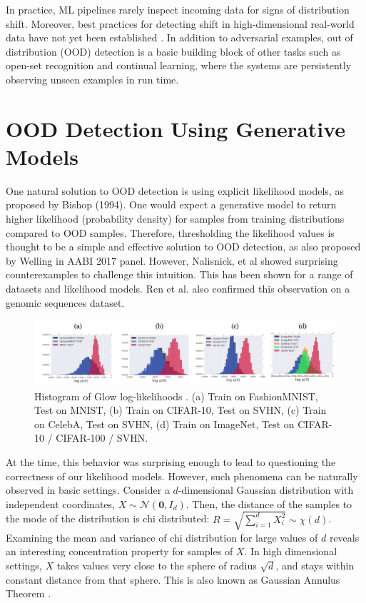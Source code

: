 In practice, ML pipelines rarely inspect incoming data for signs of distribution shift. Moreover, best practices for detecting shift in high-dimensional real-world data have not yet been established \cite{rabanser2019failing}. In addition to adversarial examples, out of distribution (OOD) detection is a basic building block of other tasks such as open-set recognition \cite{ren2019likelihood} and continual learning, where the systems are persistently observing unseen examples in run time.

\section{OOD Detection Using Generative Models}

One natural solution to OOD detection is using explicit likelihood models, as proposed by Bishop (1994). One would expect a generative model to return higher likelihood (probability density) for samples from training distributions compared to OOD samples. Therefore, thresholding the likelihood values is thought to be a simple and effective solution to OOD detection, as also proposed by Welling in AABI 2017 panel. However, Nalisnick, et al \cite{nalisnick2018deep} showed surprising counterexamples to challenge this intuition. This has been shown for a range of datasets and likelihood models. Ren et al. \cite{ren2019likelihood} also confirmed this observation on a genomic sequences dataset. 

\begin{figure}[h]
    \centering
    \vspace{-1em}
    \includegraphics[width=\textwidth]{figures/ch4/nalisnic.png}
    \caption{Histogram of Glow log-likelihoods \cite{nalisnick2018deep}. (a) Train on FashionMNIST, Test on MNIST, (b) Train on CIFAR-10, Test on SVHN, (c) Train on CelebA, Test on SVHN, (d) Train on ImageNet, Test on CIFAR-10 / CIFAR-100 / SVHN.}
    \label{fig:4-3}
\end{figure}

At the time, this behavior was surprising enough to lead to questioning the correctness of our likelihood models. However, such phenomena can be naturally observed in basic settings. Consider a $d$-dimensional Gaussian distribution with independent coordinates, $X \sim \mathcal{N}(\bm{0}, I_d)$. Then, the distance of the samples to the mode of the distribution is chi distributed: $R = \sqrt{\sum_{i=1}^d X_i^2} \sim \chi(d)$. Examining the mean and variance of chi distribution for large values of $d$ reveals an interesting concentration property for samples of $X$. In high dimensional settings, $X$ takes values very close to the sphere of radius $\sqrt{d}$, and stays within constant distance from that sphere. This is also known as Gaussian Annulus Theorem \cite{vershynin2018high}.

